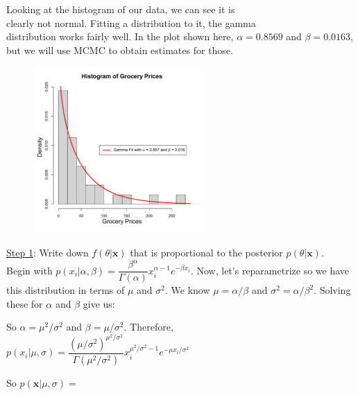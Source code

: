 \documentclass[11pt]{article}
\begin{document}
Looking at the histogram of our data, we can see it is\\
clearly not normal. Fitting a distribution to it, the gamma\\
distribution works fairly well. In the plot shown here, $\alpha=0.8569$ and $\beta=0.0163$, but we will use MCMC to obtain estimates for those. 
\vspace{-2.9in}

\begin{figure}[H]
\raggedleft
\includegraphics[width=2.5in]{bayes_figs/Grocery_hist.pdf}
\end{figure}

\newpage

\uline{Step 1}: Write down $f(\theta|\boldsymbol{x})$ that is proportional to the posterior $p(\theta|\boldsymbol{x})$.\\
Begin with $p(x_i|\alpha,\beta)=\dfrac{\beta^\alpha}{\Gamma(\alpha)}x_i^{\alpha-1}e^{-\beta x_i}$. Now, let's reparametrize so we have this distribution in terms of $\mu$ and $\sigma^2$. We know $\mu=\alpha/\beta$ and $\sigma^2=\alpha/\beta^2$. Solving these for $\alpha$ and $\beta$ give us:
\vspace{1in}

So $\alpha=\mu^2/\sigma^2$ and $\beta=\mu/\sigma^2$. Therefore, 
$p(x_i|\mu,\sigma)=\dfrac{(\mu/\sigma^2)^{\mu^2/\sigma^2}}{\Gamma(\mu^2/\sigma^2)}x_i^{\mu^2/\sigma^2-1}e^{-\mu x_i/\sigma^2}$

So $p(\boldsymbol{x}|\mu,\sigma)=$

\vspace{1.5in}
\end{document}

